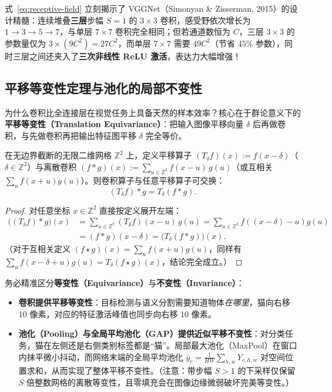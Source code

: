 式~\eqref{eq:receptive-field} 立刻揭示了 VGGNet（Simonyan \& Zisserman, 2015）的设计精髓：连续堆叠\textbf{三层}步幅 $S=1$ 的 $3\times 3$ 卷积，感受野依次增长为 $1 \to 3 \to 5 \to 7$，与单层 $7\times 7$ 卷积完全相同；但若通道数恒为 $C$，三层 $3\times 3$ 的参数量仅为 $3 \times (9 C^2) = 27 C^2$，而单层 $7\times 7$ 需要 $49 C^2$（节省 $45\%$ 参数），同时三层之间还夹入了\textbf{三次非线性 ReLU 激活}，表达力大幅增强！

\subsection{平移等变性定理与池化的局部不变性}

为什么卷积比全连接层在视觉任务上具备天然的样本效率？核心在于群论意义下的\textbf{平移等变性（Translation Equivariance）}：把输入图像平移向量 $\delta$ 后再做卷积，与先做卷积再把输出特征图平移 $\delta$ 完全等价。

\begin{thmBox}
\begin{theorem}[卷积的平移等变性]
\label{thm:conv-equivariance}
在无边界截断的无限二维网格 $\mathbb{Z}^2$ 上，定义平移算子 $(T_\delta f)(x) := f(x - \delta)$（$\delta \in \mathbb{Z}^2$）与离散卷积 $(f * g)(x) := \sum_{u \in \mathbb{Z}^2} f(x - u)\, g(u)$（或互相关 $\sum_u f(x + u) g(u)$）。则卷积算子与任意平移算子可交换：
\begin{equation}
  (T_\delta f) * g = T_\delta (f * g).
  \label{eq:equivariance}
\end{equation}
\end{theorem}
\begin{proof}
对任意坐标 $x \in \mathbb{Z}^2$ 直接按定义展开左端：
\begin{align*}
  \big((T_\delta f) * g\big)(x)
  &= \sum_{u \in \mathbb{Z}^2} (T_\delta f)(x - u)\, g(u)
   = \sum_{u \in \mathbb{Z}^2} f\!\left((x - \delta) - u\right) g(u) \\
  &= (f * g)(x - \delta)
   = \big(T_\delta (f * g)\big)(x).
\end{align*}
（对于互相关定义 $(f \star g)(x) = \sum_u f(x+u) g(u)$，同样有 $\sum_u f(x-\delta+u)g(u) = T_\delta(f \star g)(x)$，结论完全成立。）
\end{proof}
\end{thmBox}

务必精准区分\textbf{等变性（Equivariance）}与\textbf{不变性（Invariance）}：
\begin{itemize}
  \item \textbf{卷积提供平移等变性}：目标检测与语义分割需要知道物体\emph{在哪里}，猫向右移 10 像素，对应的特征激活峰值也同步向右移 10 像素。
  \item \textbf{池化（Pooling）与全局平均池化（GAP）提供近似平移不变性}：对分类任务，猫在左侧还是右侧类别标签都是“猫”。局部最大池化（MaxPool）在窗口内抹平微小抖动，而网络末端的全局平均池化 $\bar{y}_c = \frac{1}{HW}\sum_{h,w} Y_{c,h,w}$ 对空间位置求和，从而实现了整体平移不变性。（注意：带步幅 $S > 1$ 的下采样仅保留 $S$ 倍整数网格的离散等变性，且零填充会在图像边缘微弱破坏完美等变性。）
\end{itemize}

